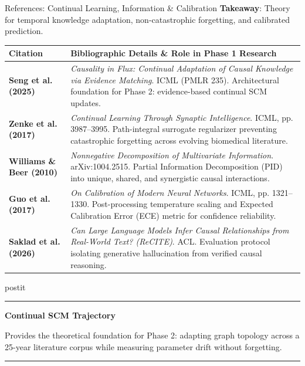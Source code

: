 \documentclass[aspectratio=43,10pt]{beamer}
\newcommand{\card}[4][\linewidth]{%
  \begin{beamercolorbox}[wd=#1,sep=0pt,rounded=false,shadow=false]{postit}%
    {\color{#3}\rule{\linewidth}{1.5pt}}\par
    \colorbox{slatebg}{%
      \begin{minipage}{\dimexpr#1-8pt\relax}%
        \vspace{1.5pt}%
        {\footnotesize\bfseries\color{#3}#2}\vspace{1.5pt}\par%
        {\scriptsize\color{darktext}#4}%
        \vspace{1.5pt}%
      \end{minipage}%
    }%
    \par{\color{bordergray}\rule{\linewidth}{0.6pt}}%
  \end{beamercolorbox}%
}
\begin{document}
\begin{frame}{References: Continual Learning, Information \& Calibration}
  \vspace{-0.08cm}
  \textbf{Takeaway}: Theory for temporal knowledge adaptation, non-catastrophic forgetting, and calibrated prediction.
  \vspace{0.05cm}
  \begin{center}
    \fontsize{5.1pt}{6.3pt}\selectfont
    \begin{tabularx}{\linewidth}{p{2.2cm}>{\raggedright\arraybackslash}X}
      \toprule
      \textbf{\color{navy}Citation} & \textbf{\color{navy}Bibliographic Details \& Role in Phase 1 Research} \\
      \midrule
      \textbf{Seng et al. (2025)} & \textit{Causality in Flux: Continual Adaptation of Causal Knowledge via Evidence Matching}. ICML (PMLR 235). Architectural foundation for Phase 2: evidence-based continual SCM updates. \\
      \addlinespace[1.5pt]
      \textbf{Zenke et al. (2017)} & \textit{Continual Learning Through Synaptic Intelligence}. ICML, pp. 3987--3995. Path-integral surrogate regularizer preventing catastrophic forgetting across evolving biomedical literature. \\
      \addlinespace[1.5pt]
      \textbf{Williams \& Beer (2010)} & \textit{Nonnegative Decomposition of Multivariate Information}. arXiv:1004.2515. Partial Information Decomposition (PID) into unique, shared, and synergistic causal interactions. \\
      \addlinespace[1.5pt]
      \textbf{Guo et al. (2017)} & \textit{On Calibration of Modern Neural Networks}. ICML, pp. 1321--1330. Post-processing temperature scaling and Expected Calibration Error (ECE) metric for confidence reliability. \\
      \addlinespace[1.5pt]
      \textbf{Saklad et al. (2026)} & \textit{Can Large Language Models Infer Causal Relationships from Real-World Text? (ReCITE)}. ACL. Evaluation protocol isolating generative hallucination from verified causal reasoning. \\
      \bottomrule
    \end{tabularx}
  \end{center}
  \vspace{0.04cm}
  \card{Continual SCM Trajectory}{teal}{
    \fontsize{5.2pt}{6.4pt}\selectfont Provides the theoretical foundation for Phase 2: adapting graph topology across a 25-year literature corpus while measuring parameter drift without forgetting.
  }
\end{frame}
\end{document}
